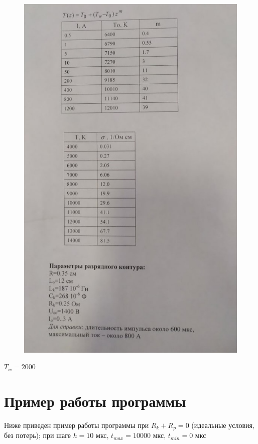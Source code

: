\documentclass[a4paper,12pt]{article}
\begin{document}
\begin{figure}[h!]
	\begin{center}
		{\includegraphics[scale = 0.4]{const.jpg}}
		\label{const}
	\end{center}
\end{figure}

$T_w = 2000$

\newpage
\section{Пример работы программы}

Ниже приведен пример работы программы при $R_k + R_p = 0$ (идеальные условия, без потерь); при шаге $h = 10$ мкс, $t_{max} = 10000$ мкс, $t_{min} = 0$ мкс
\end{document}
